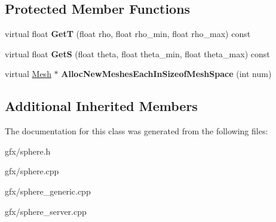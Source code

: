 \subsection*{Protected Member Functions}
\begin{DoxyCompactItemize}
\item 
virtual float {\bfseries GetT} (float rho, float rho\+\_\+min, float rho\+\_\+max) const \hypertarget{classCityLights_a6fabdb95b908ed8896a6e0cc528fb27b}{}\label{classCityLights_a6fabdb95b908ed8896a6e0cc528fb27b}

\item 
virtual float {\bfseries GetS} (float theta, float theta\+\_\+min, float theta\+\_\+max) const \hypertarget{classCityLights_a13021e4d10d90d6808ac53f0904aa083}{}\label{classCityLights_a13021e4d10d90d6808ac53f0904aa083}

\item 
virtual \hyperlink{classMesh}{Mesh} $\ast$ {\bfseries Alloc\+New\+Meshes\+Each\+In\+Sizeof\+Mesh\+Space} (int num)\hypertarget{classCityLights_a998821df5af993b702742449224dc645}{}\label{classCityLights_a998821df5af993b702742449224dc645}

\end{DoxyCompactItemize}
\subsection*{Additional Inherited Members}


The documentation for this class was generated from the following files\+:\begin{DoxyCompactItemize}
\item 
gfx/sphere.\+h\item 
gfx/sphere.\+cpp\item 
gfx/sphere\+\_\+generic.\+cpp\item 
gfx/sphere\+\_\+server.\+cpp\end{DoxyCompactItemize}
